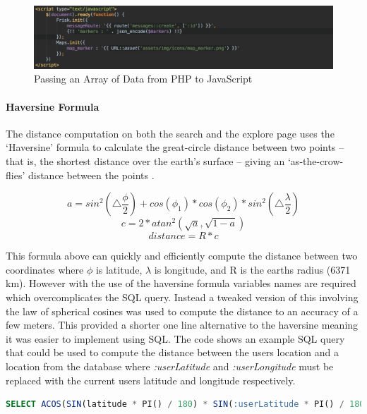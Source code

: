 \begin{figure}[H]
	\centering
	\includegraphics[width=1.0\textwidth]{images/Code/Locations_PHP_To_JS}
	\caption{Passing an Array of Data from PHP to JavaScript} \label{fig:Locations_PHP_To_JS}
\end{figure}

\paragraph{Haversine Formula}
The distance computation on both the search and the explore page uses the ‘Haversine’ formula to calculate the great-circle distance between two points – that is, the shortest distance over the earth’s surface – giving an ‘as-the-crow-flies’ distance between the points \cite{MovableType:Haversine}. 

\begin{equation}
	a = sin^2 (\triangle \frac{\phi}{2}) + cos (\phi_1) * cos (\phi_2) * sin^2 (\triangle \frac{\lambda}{2})
\end{equation}
\begin{equation}
	c = 2 * atan^2(\sqrt{a}, \sqrt{1-a})
\end{equation}
\begin{equation}
	distance = R * c
\end{equation}

This formula above can quickly and efficiently compute the distance between two coordinates where $\phi$ is latitude, $\lambda$ is longitude, and R is the earths radius (6371 km). However with the use of the haversine formula variables names are required which overcomplicates the SQL query. Instead a tweaked version of this involving the law of spherical cosines was used to compute the distance to an accuracy of a few meters. This provided a shorter one line alternative to the haversine meaning it was easier to implement using SQL. The code shows an example SQL query that could be used to compute the distance between the users location and a location from the database where \emph{:userLatitude} and \emph{:userLongitude} must be replaced with the current users latitude and longitude respectively.

\begin{lstlisting}[language=sql]
	SELECT ACOS(SIN(latitude * PI() / 180) * SIN(:userLatitude * PI() / 180) + COS(latitude * PI() / 180) * COS(:userLatitude * PI() / 180) * COS(:userLongitude * PI() / 180 - longitude * PI() / 180) ) * 6371000 AS distance FROM locations
\end{lstlisting}

